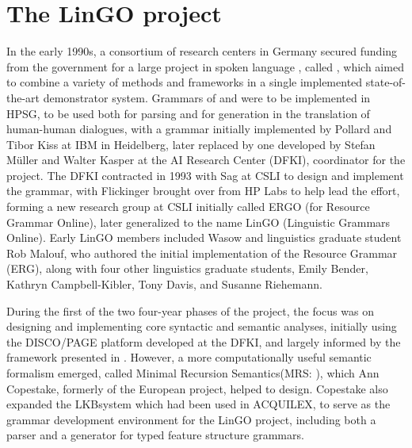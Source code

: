 \documentclass[output=paper,biblatex,babelshorthands,newtxmath,draftmode,colorlinks,citecolor=brown]{langscibook}
\begin{document}
\section{The LinGO project}

\largerpage
In the early 1990s, a consortium of research centers in Germany secured funding from the  government for a large project in spoken language , called \verbmobil \citep{Wahlster2000a-ed}, which aimed to combine a variety of methods and frameworks in a single implemented state-of-the-art demonstrator system.  Grammars of  and  were to be implemented in HPSG, to be used both for parsing and for generation in the translation of human-human dialogues, with a  grammar initially implemented by Pollard and Tibor Kiss at IBM in Heidelberg, later replaced by one developed by Stefan Müller and Walter Kasper at the  AI Research Center (DFKI), coordinator for the \verbmobil project.  The DFKI contracted in 1993 with Sag at CSLI to design and implement the  grammar, with Flickinger brought over from HP Labs to help lead the effort, forming a new research group at CSLI initially called ERGO (for  Resource Grammar Online), later generalized to the name LinGO (Linguistic Grammars Online).  Early LinGO members included Wasow and linguistics graduate student Rob Malouf, who authored the initial implementation of the  Resource Grammar (ERG), along with four other linguistics graduate students, Emily Bender, Kathryn Campbell-Kibler, Tony Davis, and Susanne Riehemann.

During the first of the two four-year phases of the \verbmobil project, the focus was on designing and implementing core syntactic and semantic analyses, initially using the DISCO/PAGE platform \citep{DISCO94} developed at the DFKI, and largely informed by the framework presented in \citet{ps2}.  However, a more computationally useful semantic formalism emerged, called Minimal Recursion Semantics\indexmrs (MRS: \citealt*{CFPS2005a}), which Ann Copestake, formerly of the European  project, helped to design.  Copestake also expanded the LKB\indexlkb system \citep{Copestake2002a} which had been used in ACQUILEX, to serve as the grammar development environment for the LinGO project, including both a parser and a generator for typed feature structure grammars.
\end{document}
